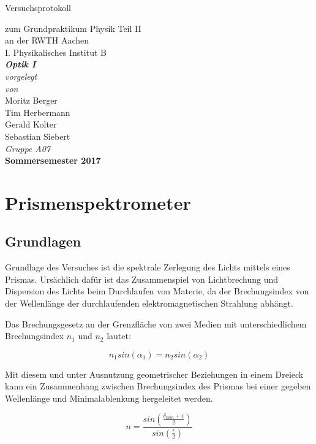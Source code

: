 \documentclass[12pt,a4paper]{article}
\author{Tim}
\begin{document}
	\setlength{\parindent}{0pt} 
	\begin{center}
		{\LARGE Versuchsprotokoll}\\
		\begin{large}
			zum Grundpraktikum Physik Teil II\\[0.4cm]
			an der RWTH Aachen\\
			I. Physikalisches Institut B\\[4.5cm]
			\Large\textbf{\textsl{Optik I}}\\[4cm]
			\normalsize\textit{vorgelegt\\von}\\[0.4cm]
			\large{Moritz Berger\\Tim Herbermann\\Gerald Kolter\\Sebastian Siebert}\\[1cm]
			\large \textit{Gruppe A07} \\ [3cm]
			\large \textbf{Sommersemester 2017}
		\end{large}
	\end{center}
	\newpage

\tableofcontents
\newpage

\section{Prismenspektrometer}

\subsection{Grundlagen}
Grundlage des Versuches ist die spektrale Zerlegung des Lichts mittels eines Prismas. Ursächlich dafür ist das Zusammenspiel von Lichtbrechung und Dispersion des Lichts beim Durchlaufen von Materie, da der Brechungsindex von der Wellenlänge der durchlaufenden elektromagnetischen Strahlung abhängt.

Das Brechungsgesetz an der Grenzfläche von zwei Medien mit unterschiedlichem Brechungsindex $n_1$ und $n_2$ lautet:

\begin{equation}
n_1 sin(\alpha_1) = n_2 sin(\alpha_2)
\end{equation}

Mit diesem und unter Ausnutzung geometrischer Beziehungen in einem Dreieck kann ein Zusammenhang zwischen Brechungsindex des Prismas bei einer gegeben Wellenlänge und Minimalablenkung hergeleitet werden.

\begin{equation}
n = \frac{sin(\frac{\delta_{min}+\epsilon}{2})}{sin(\frac{\epsilon}{2})}
\end{equation}
\end{document}

